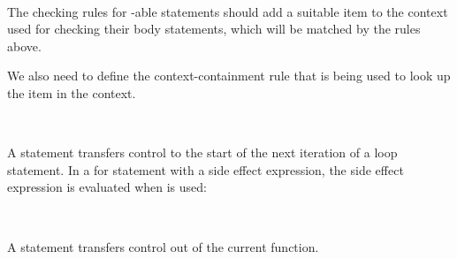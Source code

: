 \begin{Checking}
	 \\

\end{Checking}

\begin{Incomplete}
The checking rules for -able statements should add a suitable item to the context used for checking their body statements, which will be matched by the rules above.

We also need to define the context-containment rule that is being used to look up the  item in the context.
\end{Incomplete}


\begin{Syntax}
		 \SynOpt \code{;} \\
\end{Syntax}

\begin{Description}
A  statement transfers control to the start of the next iteration of a loop statement.
In a for statement with a side effect expression, the side effect expression is evaluated when  is used:
\end{Description}

\begin{Checking}
	 \\

\end{Checking}


\begin{Description}
	A  statement transfers control out of the current function.
\end{Description}
	
